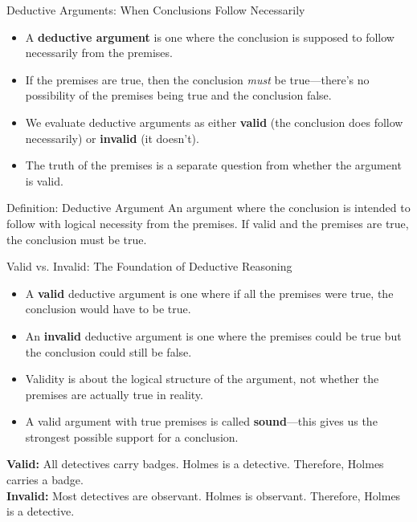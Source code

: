 \documentclass{beamer}
\begin{document}
	\begin{frame}{Deductive Arguments: When Conclusions Follow Necessarily}
		\begin{itemize}
			\item A \textbf{deductive argument} is one where the conclusion is supposed to follow necessarily from the premises.
			\item If the premises are true, then the conclusion \textit{must} be true—there's no possibility of the premises being true and the conclusion false.
			\item We evaluate deductive arguments as either \textbf{valid} (the conclusion does follow necessarily) or \textbf{invalid} (it doesn't).
			\item The truth of the premises is a separate question from whether the argument is valid.
		\end{itemize}
		
		\begin{block}{Definition: Deductive Argument}
			An argument where the conclusion is intended to follow with logical necessity from the premises. If valid and the premises are true, the conclusion must be true.
		\end{block}
	\end{frame}
	
	\begin{frame}{Valid vs. Invalid: The Foundation of Deductive Reasoning}
		\begin{itemize}
			\item A \textbf{valid} deductive argument is one where if all the premises were true, the conclusion would have to be true.
			\item An \textbf{invalid} deductive argument is one where the premises could be true but the conclusion could still be false.
			\item Validity is about the logical structure of the argument, not whether the premises are actually true in reality.
			\item A valid argument with true premises is called \textbf{sound}—this gives us the strongest possible support for a conclusion.
		\end{itemize}
		
		\begin{example}
			\textbf{Valid:} All detectives carry badges. Holmes is a detective. Therefore, Holmes carries a badge.
			\\[0.5em]
			\textbf{Invalid:} Most detectives are observant. Holmes is observant. Therefore, Holmes is a detective.
		\end{example}
	\end{frame}
	
\end{document}
